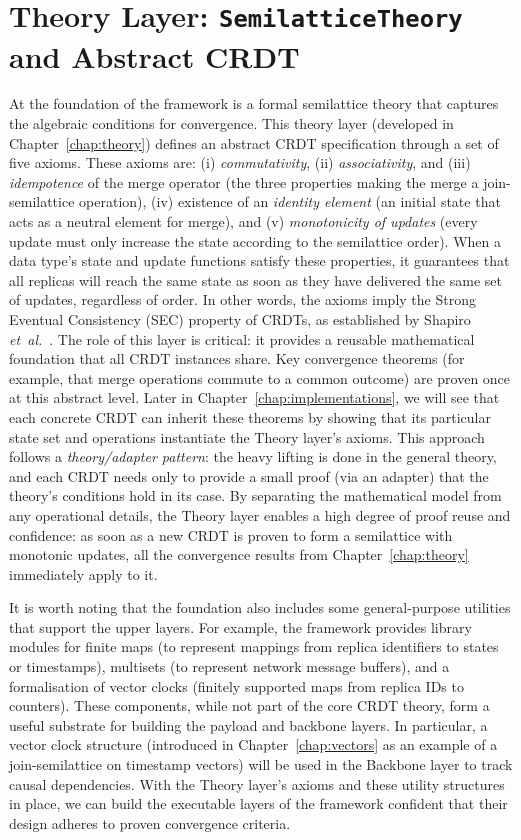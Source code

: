 \section{Theory Layer: \texttt{SemilatticeTheory} and Abstract CRDT}
\label{sec:theory-layer}

At the foundation of the framework is a formal semilattice theory that captures the algebraic conditions for convergence. This theory layer (developed in Chapter~\ref{chap:theory}) defines an abstract CRDT specification through a set of five axioms. These axioms are: (i) \emph{commutativity}, (ii) \emph{associativity}, and (iii) \emph{idempotence} of the merge operator (the three properties making the merge a join-semilattice operation), (iv) existence of an \emph{identity element} (an initial state that acts as a neutral element for merge), and (v) \emph{monotonicity of updates} (every update must only increase the state according to the semilattice order). When a data type’s state and update functions satisfy these properties, it guarantees that all replicas will reach the same state as soon as they have delivered the same set of updates, regardless of order. In other words, the axioms imply the Strong Eventual Consistency (SEC) property of CRDTs, as established by Shapiro \emph{et~al.}~\cite{shapiro2011conflict}. The role of this layer is critical: it provides a reusable mathematical foundation that all CRDT instances share. Key convergence theorems (for example, that merge operations commute to a common outcome) are proven once at this abstract level. Later in Chapter~\ref{chap:implementations}, we will see that each concrete CRDT can inherit these theorems by showing that its particular state set and operations instantiate the Theory layer’s axioms. This approach follows a \emph{theory/adapter pattern}: the heavy lifting is done in the general theory, and each CRDT needs only to provide a small proof (via an adapter) that the theory’s conditions hold in its case. By separating the mathematical model from any operational details, the Theory layer enables a high degree of proof reuse and confidence: as soon as a new CRDT is proven to form a semilattice with monotonic updates, all the convergence results from Chapter~\ref{chap:theory} immediately apply to it.

It is worth noting that the foundation also includes some general-purpose utilities that support the upper layers. For example, the framework provides library modules for finite maps (to represent mappings from replica identifiers to states or timestamps), multisets (to represent network message buffers), and a formalisation of vector clocks (finitely supported maps from replica IDs to counters). These components, while not part of the core CRDT theory, form a useful substrate for building the payload and backbone layers. In particular, a vector clock structure (introduced in Chapter~\ref{chap:vectors} as an example of a join-semilattice on timestamp vectors) will be used in the Backbone layer to track causal dependencies. With the Theory layer’s axioms and these utility structures in place, we can build the executable layers of the framework confident that their design adheres to proven convergence criteria.

